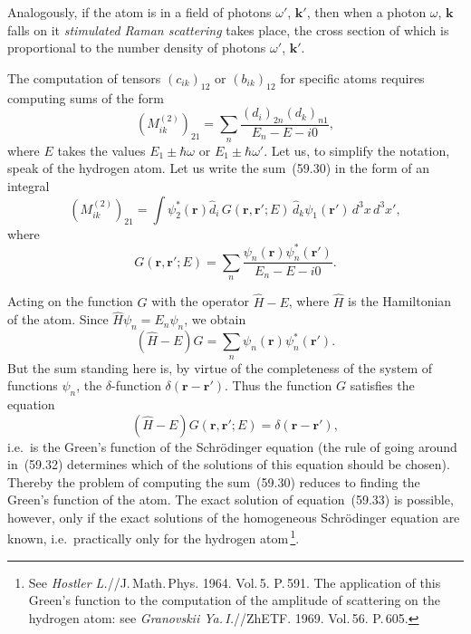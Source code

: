 Analogously, if the atom is in a field of photons $\omega'$, $\mathbf{k}'$, then when a photon $\omega$, $\mathbf{k}$ falls on it \textit{stimulated Raman scattering} takes place, the cross section of which is proportional to the number density of photons $\omega'$, $\mathbf{k}'$.

The computation of tensors $(c_{ik})_{12}$ or $(b_{ik})_{12}$ for specific atoms requires computing sums of the form
\begin{equation}
(M^{(2)}_{ik})_{21} = \sum_n\frac{(d_i)_{2n}(d_k)_{n1}}{E_n - E - i0},
\tag{59.30}
\end{equation}
where $E$ takes the values $E_1 \pm \hbar\omega$ or $E_1 \pm \hbar\omega'$. Let us, to simplify the notation, speak of the hydrogen atom. Let us write the sum~(59.30) in the form of an integral
\begin{equation}
(M^{(2)}_{ik})_{21} = \int\psi^*_2(\mathbf{r})\hat{d}_i\,G(\mathbf{r},\mathbf{r}';E)\,\hat{d}_k\psi_1(\mathbf{r}')\,d^3x\,d^3x',
\tag{59.31}
\end{equation}
where
\begin{equation}
G(\mathbf{r},\mathbf{r}';E) = \sum_n\frac{\psi_n(\mathbf{r})\psi^*_n(\mathbf{r}')}{E_n - E - i0}.
\tag{59.32}
\end{equation}

Acting on the function $G$ with the operator $\hat{H} - E$, where $\hat{H}$ is the Hamiltonian of the atom. Since $\hat{H}\psi_n = E_n\psi_n$, we obtain
\[
(\hat{H} - E)G = \sum_n\psi_n(\mathbf{r})\psi^*_n(\mathbf{r}').
\]
But the sum standing here is, by virtue of the completeness of the system of functions $\psi_n$, the $\delta$-function $\delta(\mathbf{r} - \mathbf{r}')$. Thus the function $G$ satisfies the equation
\begin{equation}
(\hat{H} - E)G(\mathbf{r},\mathbf{r}';E) = \delta(\mathbf{r} - \mathbf{r}'),
\tag{59.33}
\end{equation}
i.e.\ is the Green's function of the Schr\"odinger equation (the rule of going around in~(59.32) determines which of the solutions of this equation should be chosen). Thereby the problem of computing the sum~(59.30) reduces to finding the Green's function of the atom. The exact solution of equation~(59.33) is possible, however, only if the exact solutions of the homogeneous Schr\"odinger equation are known, i.e.\ practically only for the hydrogen atom\,\footnote{See \textit{Hostler L.}//J.\,Math.\,Phys. 1964. Vol.\,5. P.\,591. The application of this Green's function to the computation of the amplitude of scattering on the hydrogen atom: see \textit{Granovskii Ya.\,I.}//ZhETF. 1969. Vol.\,56. P.\,605.}.

